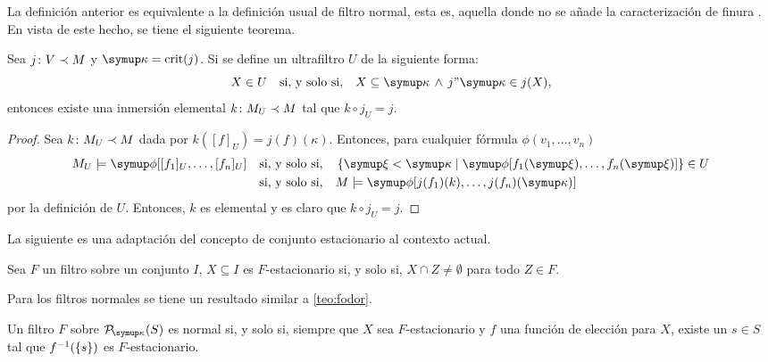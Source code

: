 La definición anterior es equivalente \autocite[Ejercicio 22.5]{kanamori_higher_2009}
a la definición usual de filtro normal, esta es, aquella donde no se añade
la caracterización de finura \autocite[52]{kanamori_higher_2009}.
En vista de este hecho, se tiene el siguiente teorema.

\begin{teo}\label{teo:exists-k}
    Sea $j\colon V\prec M$ y $\kappa=\crit{j}$. Si se define un ultrafiltro $U$
    de la siguiente forma:
    \[
        X\in U\quad\text{si, y solo si,}\quad X\subseteq \kappa \,\land\, j"\kappa\in j(X),
    \]
    entonces existe una inmersión elemental $k\colon M_U\prec M$ tal que $k\circ j_U = j$.
\end{teo}

\begin{proof}
    Sea $k\colon M_U\prec M$ dada por $k([f]_U)=j(f)(\kappa)$. Entonces, para
    cualquier fórmula $\phi(v_1,\dots,v_n)$
    \begin{align*}
        M_U \models\phi[[f_1]_U,\dots,[f_n]_U]
        &\quad\text{si, y solo si,}\quad
        \set{\xi<\kappa\mid\phi[f_1(\xi),\dots,f_n(\xi)]} \in U \\
        &\quad\text{si, y solo si,}\quad
        M \models \phi[j(f_1)(k),\dots,j(f_n)(\kappa)]
    \end{align*}
    por la definición de $U$. Entonces, $k$ es elemental y es claro que $k\circ j_U=j$.
\end{proof}

La siguiente es una adaptación del concepto de conjunto estacionario al
contexto actual.

\begin{defi}
    Sea $F$ un filtro sobre un conjunto $I$, $X\subseteq I$ es $F$-estacionario si, y solo si,
    $X\cap Z\neq\emptyset$ para todo $Z\in F$.
\end{defi}

Para los filtros normales se tiene un resultado similar a \ref{teo:fodor}.

\begin{teo}\label{teo:normal-fodor}
    Un filtro $F$ sobre $\pwset[\kappa]{S}$ es normal si, y solo si,
    siempre que $X$ sea $F$-estacionario y $f$ una función de elección para $X$,
    existe un $s\in S$ tal que $f^{-1}(\left\{ s \right\})$ es $F$-estacionario.
\end{teo}


